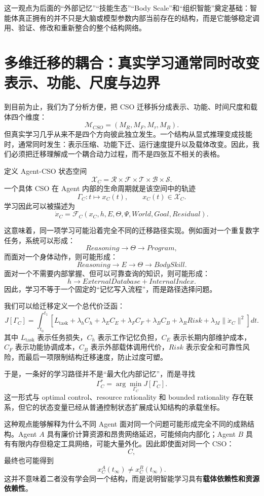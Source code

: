 这一观点为后面的“外部记忆”“技能生态”“Body Scale”和“组织智能”奠定基础：智能体真正拥有的并不只是大脑或模型参数内部当前存在的结构，而是它能够稳定调用、验证、修改和重新整合的整个结构网络。


\section{多维迁移的耦合：真实学习通常同时改变表示、功能、尺度与边界}

到目前为止，我们为了分析方便，把 CSO 迁移拆分成表示、功能、时间尺度和载体四个维度：
\[
\mathcal M_{CSO}
=
(M_R,M_F,M_\tau,M_B).
\]
但真实学习几乎从来不是四个方向彼此独立发生。一个结构从显式推理变成技能时，通常同时发生：表示压缩、功能下迁、运行速度提升以及载体改变。因此，我们必须把迁移理解成一个耦合动力过程，而不是四张互不相关的表格。

定义 Agent-CSO 状态空间
\[
\mathcal X_C
=
\mathcal R
\times
\mathcal F
\times
\mathcal T
\times
\mathcal B
\times
\mathcal S.
\]
一个具体 CSO 在 Agent 内部的生命周期就是该空间中的轨迹
\[
\Gamma_C:
t
\mapsto
x_C(t),
\qquad
x_C(t)\in\mathcal X_C.
\]
学习因此可以被描述为
\[
\dot x_C
=
\mathcal F_C
\left(
x_C,
h,
E,
\Theta,
\Psi,
World,
Goal,
Residual
\right).
\]

这意味着，同一项学习可能沿着完全不同的迁移路径实现。例如面对一个重复数字任务，系统可以形成：
\[
Reasoning
\rightarrow
\Theta
\rightarrow
Program,
\]
而面对一个身体动作，则可能形成：
\[
Reasoning
\rightarrow
E
\rightarrow
\Theta
\rightarrow
BodySkill.
\]
面对一个不需要内部掌握、但可以可靠查询的知识，则可能形成：
\[
h
\rightarrow
ExternalDatabase
+
InternalIndex.
\]
因此，学习不等于一个固定的“记忆写入流程”，而是路径选择问题。

我们可以给迁移定义一个总代价泛函：
\[
J[\Gamma_C]
=
\int_{t_0}^{t_1}
\left[
L_{\mathrm{task}}
+
\lambda_h C_h
+
\lambda_E C_E
+
\lambda_F C_F
+
\lambda_B C_B
+
\lambda_R Risk
+
\lambda_M\|\dot x_C\|^2
\right]dt.
\]
其中 $L_{\mathrm{task}}$ 表示任务损失，$C_h$ 表示工作记忆负担，$C_E$ 表示长期内部维护成本，$C_F$ 表示功能协调成本，$C_B$ 表示外部载体调用代价，$Risk$ 表示安全和可靠性风险，而最后一项限制结构迁移速度，防止过度可塑。

于是，一条好的学习路径并不是“最大化内部记忆”，而是寻找
\[
\Gamma_C^\ast
=
\arg\min_{\Gamma_C}
J[\Gamma_C].
\]
这一形式与 optimal control、resource rationality 和 bounded rationality 存在联系，但它的状态变量已经从普通控制状态扩展成认知结构的承载坐标。

这种观点能够解释为什么不同 Agent 面对同一个问题可能形成完全不同的成熟结构。Agent $A$ 具有廉价计算资源和昂贵网络延迟，可能倾向内部化；Agent $B$ 具有有限内存但稳定工具网络，可能大量外化。因此即使面对同一个 CSO：
\[
C,
\]
最终也可能得到
\[
x_C^A(t_\infty)
\neq
x_C^B(t_\infty).
\]
这并不意味着二者没有学会同一个结构，而是说明智能学习具有\textbf{载体依赖性和资源依赖性}。

